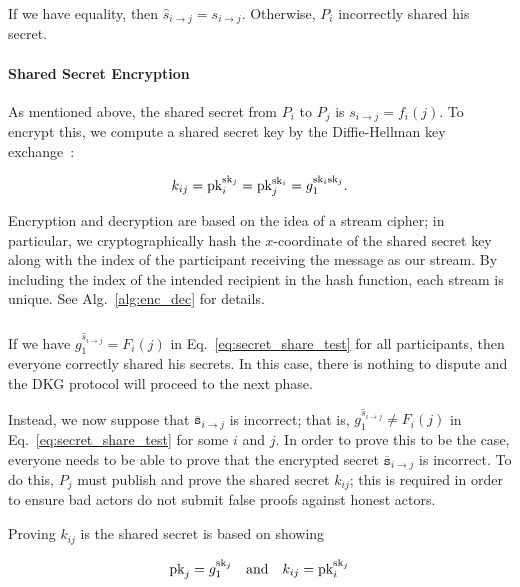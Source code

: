 \noindent
If we have equality, then $\hat{s}_{i\to j} = s_{i\to j}$.
Otherwise, $P_{i}$ incorrectly shared his secret.

\paragraph{Shared Secret Encryption}
\label{par:secret_enc}
As mentioned above, the shared secret from
$P_{i}$ to $P_{j}$ is $s_{i\to j} = f_{i}(j)$.
To encrypt this, we compute a shared secret key
by the Diffie-Hellman key exchange~\cite[Chap.~12.6.1]{hac1996}:

\begin{equation}
    k_{ij} = \textrm{pk}_{i}^{\textrm{sk}_{j}} = \textrm{pk}_{j}^{\textrm{sk}_{i}} =
    g_{1}^{\textrm{sk}_{i}\textrm{sk}_{j}}.
\end{equation}

\noindent
Encryption and decryption are based on the idea of a stream cipher;
in particular, we cryptographically hash
the $x$-coordinate of the shared secret key along with the index
of the participant receiving the message as our stream.
By including the index of the intended recipient in the hash function,
each stream is unique.
See Alg.~\ref{alg:enc_dec} for details.





\subsubsection{\ShareDistributionDispute{}}
\label{sssec:share_distribution_dispute}
If we have $g_{1}^{\hat{s}_{i\to j}} = F_{i}(j)$
in Eq.~\eqref{eq:secret_share_test} for all participants,
then everyone correctly shared his secrets.
In this case, there is nothing to dispute and the DKG protocol
will proceed to the next phase.

Instead, we now suppose that $\overline{\texttt{s}}_{i\to j}$ is incorrect;
that is, $g_{1}^{\hat{s}_{i\to j}} \ne F_{i}(j)$
in Eq.~\eqref{eq:secret_share_test} for some $i$ and $j$.
In order to prove this to be the case, everyone needs to be
able to prove that the encrypted secret
$\overline{\texttt{s}}_{i\to j}$ is incorrect.
To do this, $P_{j}$ must publish and prove the shared secret $k_{ij}$;
this is required in order to ensure bad actors
do not submit false proofs against honest actors.

Proving $k_{ij}$ is the shared secret is based on showing

\begin{equation}
    \textrm{pk}_{j} = g_{1}^{\textrm{sk}_{j}} \quad\text{and}\quad
    k_{ij} = \textrm{pk}_{i}^{\textrm{sk}_{j}}
\end{equation}

